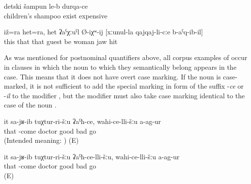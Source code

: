 %
\begin{exe}
		\ex	\label{ex:There is shampoo for children, expensive@19b}
		\gll	detski	šampun	le-b	durqa-ce\\
			children's	shampoo	exist	expensive\\
		\glt	{}

	\ex	\label{ex:‎This also and this also is probably the man who hit the woman on the jaw2}
	\gll	iž=ra	het=ra,	het	ʡaˁχːuˁl	Ø-iχʷ-ij	[xːunul-la	qajqaj-li-cːe	b-aˁq-ib-il]\\
		this	that	that	guest	be	woman	jaw	hit\\
	\glt	{}
\end{exe}

As was mentioned for postnominal quantifiers above, all corpus examples of  occur in clauses in which the noun to which they semantically belong appears in the  case. This means that it does not have overt case marking. If the noun is case-marked, it is not sufficient to add the special marking in form of the suffix -\textit{ce} or -\textit{il} to the modifier , but the modifier must also take case marking identical to the case of the noun .

\begin{exe}
	\ex	\label{ex:He went to a good doctor, he did not go to a bad one ungrammatical minor2}
	\gll	{*}	it	sa-jʁ-ib	tuχtur-ri-šːu ʡaˁħ-ce,	wahi-ce-lli-šːu	a-ag-ur\\
		{}	that	-come	doctor good	bad	go\\
	\glt	(Intended meaning: ) (E)

	\ex	\label{ex:He went to a doctor who is good; he did not go to a bad one minor2}
	\gll	it	sa-jʁ-ib	tuχtur-ri-šːu ʡaˁħ-ce-lli-šːu,	wahi-ce-lli-šːu	a-ag-ur\\
		that	-come	doctor good	bad	go\\
	\glt	{} (E)
\end{exe}

